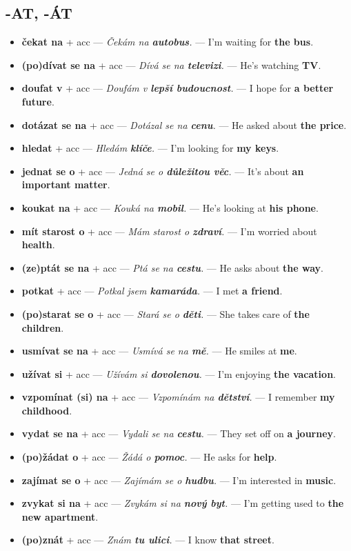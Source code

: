\documentclass[12pt]{book}
\begin{document}
\subsection*{-AT, -ÁT}
\begin{itemize}
    \item \textbf{čekat na} + acc --- \textit{Čekám na \textbf{autobus}.} --- I'm waiting for \textbf{the bus}.
    \item \textbf{(po)dívat se na} + acc --- \textit{Dívá se na \textbf{televizi}.} --- He's watching \textbf{TV}.
    \item \textbf{doufat v} + acc --- \textit{Doufám v \textbf{lepší budoucnost}.} --- I hope for \textbf{a better future}.
    \item \textbf{dotázat se na} + acc --- \textit{Dotázal se na \textbf{cenu}.} --- He asked about \textbf{the price}.
    \item \textbf{hledat} + acc --- \textit{Hledám \textbf{klíče}.} --- I'm looking for \textbf{my keys}.
    \item \textbf{jednat se o} + acc --- \textit{Jedná se o \textbf{důležitou věc}.} --- It's about \textbf{an important matter}.
    \item \textbf{koukat na} + acc --- \textit{Kouká na \textbf{mobil}.} --- He's looking at \textbf{his phone}.
    \item \textbf{mít starost o} + acc --- \textit{Mám starost o \textbf{zdraví}.} --- I'm worried about \textbf{health}.
    \item \textbf{(ze)ptát se na} + acc --- \textit{Ptá se na \textbf{cestu}.} --- He asks about \textbf{the way}.
    \item \textbf{potkat} + acc --- \textit{Potkal jsem \textbf{kamaráda}.} --- I met \textbf{a friend}.
    \item \textbf{(po)starat se o} + acc --- \textit{Stará se o \textbf{děti}.} --- She takes care of \textbf{the children}.
    \item \textbf{usmívat se na} + acc --- \textit{Usmívá se na \textbf{mě}.} --- He smiles at \textbf{me}.
    \item \textbf{užívat si} + acc --- \textit{Užívám si \textbf{dovolenou}.} --- I'm enjoying \textbf{the vacation}.
    \item \textbf{vzpomínat (si) na} + acc --- \textit{Vzpomínám na \textbf{dětství}.} --- I remember \textbf{my childhood}.
    \item \textbf{vydat se na} + acc --- \textit{Vydali se na \textbf{cestu}.} --- They set off on \textbf{a journey}.
    \item \textbf{(po)žádat o} + acc --- \textit{Žádá o \textbf{pomoc}.} --- He asks for \textbf{help}.
    \item \textbf{zajímat se o} + acc --- \textit{Zajímám se o \textbf{hudbu}.} --- I'm interested in \textbf{music}.
    \item \textbf{zvykat si na} + acc --- \textit{Zvykám si na \textbf{nový byt}.} --- I'm getting used to \textbf{the new apartment}.
    \item \textbf{(po)znát} + acc --- \textit{Znám \textbf{tu ulici}.} --- I know \textbf{that street}.
\end{itemize}
\end{document}
